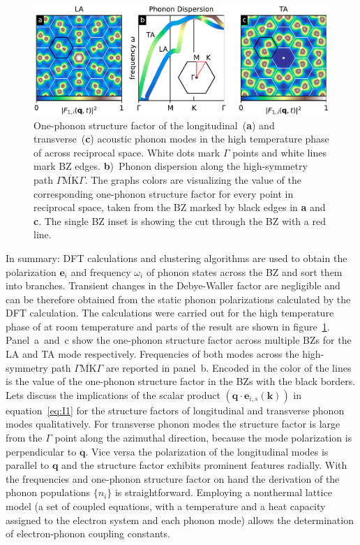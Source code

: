 \begin{figure}[!t]
	\includegraphics[width=\columnwidth]{figs/ops.pdf}
	\caption{One-phonon structure factor of the longitudinal~(\textbf{a}) and transverse~(\textbf{c}) acoustic phonon modes in the high temperature phase of \ts\space across reciprocal space. White dots mark $\Gamma$ points and white lines mark \ac{BZ} edges. \textbf{b})~Phonon dispersion along the high-symmetry path $\overline{\Gamma\mathrm{MK}\Gamma}$. The graphs colors are visualizing the value of the corresponding one-phonon structure factor for every point in reciprocal space, taken from the \ac{BZ} marked by black edges in \textbf{a} and \textbf{c}. The single \ac{BZ} inset is showing the cut through the \ac{BZ} with a red line.}
	\label{fig:ops}
\end{figure}

In summary: \Ac{DFT} calculations and clustering algorithms are used to obtain the polarization $\mathbf{e}_{i}$ and frequency $\omega_{i}$ of phonon states across the \ac{BZ} and sort them into branches.
Transient changes in the Debye-Waller factor are negligible and can be therefore obtained from the static phonon polarizations calculated by the \ac{DFT} calculation.
The calculations were carried out for the high temperature phase of \ts\space at room temperature and parts of the result are shown in figure~\ref{fig:ops}.
Panel~a~and~c show the one-phonon structure factor across multiple \acp{BZ} for the \ac{LA} and \ac{TA} mode respectively.
Frequencies of both modes across the high-symmetry path $\overline{\Gamma\mathrm{MK}\Gamma}$ are reported in panel~b.
Encoded in the color of the lines is the value of the one-phonon structure factor in the \acp{BZ} with the black borders.
Lets discuss the implications of the scalar product $\left( \mathbf{q}\cdot\mathbf{e}_{i, s}(\mathbf{k}) \right)$ in equation~\ref{eq:I1} for the structure factors of longitudinal and transverse phonon modes qualitatively.
For transverse phonon modes the structure factor is large from the $\Gamma$ point along the azimuthal direction, because the mode polarization is perpendicular to $\mathbf{q}$.
Vice versa the polarization of the longitudinal modes is parallel to $\mathbf{q}$ and the structure factor exhibits prominent features radially.
With the frequencies and one-phonon structure factor on hand the derivation of the phonon populations $\{n_{i}\}$ is straightforward.
Employing a nonthermal lattice model\cite{waldecker2016} (a set of coupled equations, with a temperature and a heat capacity assigned to the electron system and each phonon mode) allows the determination of electron-phonon coupling constants.


